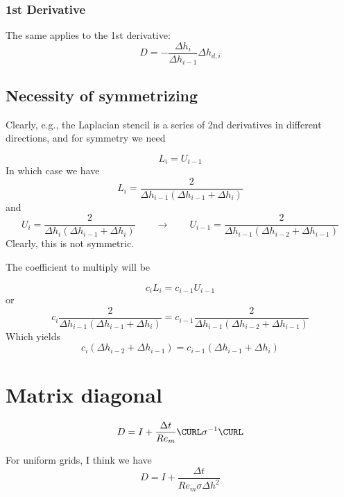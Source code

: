 \documentclass[landscape]{article}
\begin{document}
\subsubsection{1st Derivative}
The same applies to the 1st derivative:
\begin{equation}
   D = - \frac{\Delta h_{i}}{\Delta h_{i-1}} \Delta h_{d,i}
\end{equation}


\subsection{Necessity of symmetrizing}

Clearly, e.g., the Laplacian stencil is a series of 2nd derivatives in different directions, and for symmetry we need

\begin{equation}
  L_{i} = U_{i-1}
\end{equation}
In which case we have
\begin{equation}
  L_{i} = \frac{2}{\Delta h_{{i-1}} \left(\Delta h_{{i-1}} + \Delta h_{{i}}\right)}
\end{equation}
and
\begin{equation}
  U_{i} = \frac{2}{\Delta h_{{i}} \left(\Delta h_{{i-1}} + \Delta h_{{i}}\right)}
  \qquad \rightarrow
  \qquad
  U_{i-1} = \frac{2}{\Delta h_{{i-1}} \left(\Delta h_{{i-2}} + \Delta h_{{i-1}}\right)}
\end{equation}
Clearly, this is not symmetric.

The coefficient to multiply will be

\begin{equation}
  c_i L_{i} = c_{i-1} U_{i-1}
\end{equation}
or
\begin{equation}
  c_i \frac{2}{\Delta h_{{i-1}} \left(\Delta h_{{i-1}} + \Delta h_{{i}}\right)} =
  c_{i-1} \frac{2}{\Delta h_{{i-1}} \left(\Delta h_{{i-2}} + \Delta h_{{i-1}}\right)}
\end{equation}
Which yields
\begin{equation}
  c_i (\Delta h_{{i-2}} + \Delta h_{{i-1}}) =
  c_{i-1} (\Delta h_{{i-1}} + \Delta h_{{i}})
\end{equation}

\section{Matrix diagonal}
\begin{equation}
  D = I + \frac{\Delta t}{Re_m} \CURL \sigma^{-1} \CURL
\end{equation}

For uniform grids, I think we have
\begin{equation}
  D = I + \frac{\Delta t}{Re_m \sigma \Delta h^2}
\end{equation}
\end{document}
